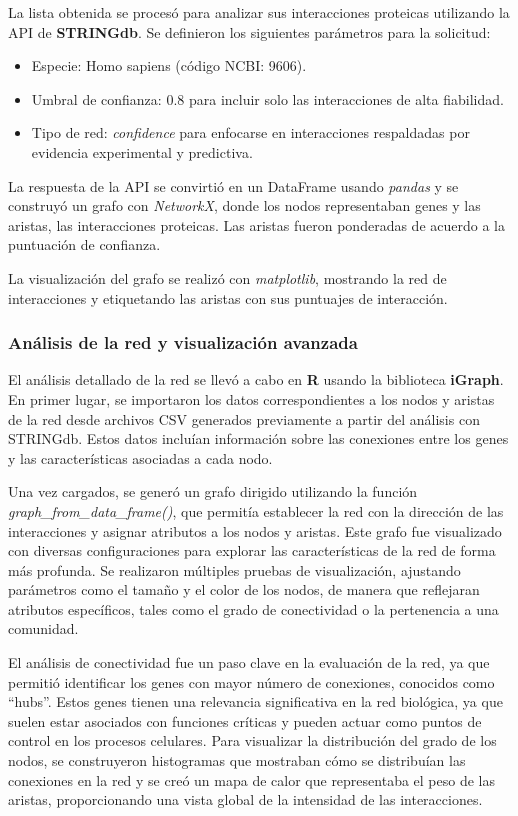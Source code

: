 La lista obtenida se procesó para analizar sus interacciones proteicas utilizando la API de \textbf{STRINGdb}. Se definieron los siguientes parámetros para la solicitud:

\begin{itemize}
	\item Especie: Homo sapiens (código NCBI: 9606).
	\item Umbral de confianza: 0.8 para incluir solo las interacciones de alta fiabilidad.
	\item Tipo de red: \textit{confidence} para enfocarse en interacciones respaldadas por evidencia experimental y predictiva.
\end{itemize}

La respuesta de la API se convirtió en un DataFrame usando \textit{pandas} y se construyó un grafo con \textit{NetworkX}, donde los nodos representaban genes y las aristas, las interacciones proteicas. Las aristas fueron ponderadas de acuerdo a la puntuación de confianza.

La visualización del grafo se realizó con \textit{matplotlib}, mostrando la red de interacciones y etiquetando las aristas con sus puntuajes de interacción.

\subsubsection{\textbf{Análisis de la red y visualización avanzada}}

El análisis detallado de la red se llevó a cabo en \textbf{R} usando la biblioteca \textbf{iGraph}. En primer lugar, se importaron los datos correspondientes a los nodos y aristas de la red desde archivos CSV generados previamente a partir del análisis con STRINGdb. Estos datos incluían información sobre las conexiones entre los genes y las características asociadas a cada nodo.

Una vez cargados, se generó un grafo dirigido utilizando la función \textit{graph\_from\_data\_frame()}, que permitía establecer la red con la dirección de las interacciones y asignar atributos a los nodos y aristas. Este grafo fue visualizado con diversas configuraciones para explorar las características de la red de forma más profunda. Se realizaron múltiples pruebas de visualización, ajustando parámetros como el tamaño y el color de los nodos, de manera que reflejaran atributos específicos, tales como el grado de conectividad o la pertenencia a una comunidad.

El análisis de conectividad fue un paso clave en la evaluación de la red, ya que permitió identificar los genes con mayor número de conexiones, conocidos como “hubs”. Estos genes tienen una relevancia significativa en la red biológica, ya que suelen estar asociados con funciones críticas y pueden actuar como puntos de control en los procesos celulares. Para visualizar la distribución del grado de los nodos, se construyeron histogramas que mostraban cómo se distribuían las conexiones en la red y se creó un mapa de calor que representaba el peso de las aristas, proporcionando una vista global de la intensidad de las interacciones.

